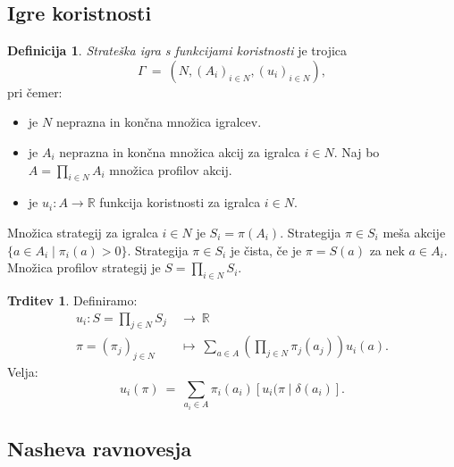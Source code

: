 \documentclass[11pt]{article}
\newcommand{\R}{\mathbb{R}}
\newcommand{\set}[1]{\{#1\}}
\newcommand{\oklepaj}[1]{\left(#1\right)}
\newcommand{\oglati}[1]{\left[#1\right]}
\theoremstyle{definition}
\newtheorem{definicija}{Definicija}[section]
\theoremstyle{definition}
\newtheorem{trditev}{Trditev}[section]
\theoremstyle{definition}
\theoremstyle{definition}
\begin{document}

\subsection{Igre koristnosti}
\vspace{0.5cm}

\begin{definicija}

\textit{Strateška igra s funkcijami koristnosti} je trojica 
$$\Gamma ~=~ (N, (A_i)_{i \in N}, (u_i)_{i \in N}),$$
pri čemer:
\begin{itemize}
	\item je $N$ neprazna in končna množica igralcev.
	\item je $A_i$ neprazna in končna množica akcij za igralca $i \in N$. Naj bo $A = \prod_{i \in N} A_i$ množica profilov akcij.
	\item je $u_i: A \rightarrow \R$ funkcija koristnosti za igralca $i \in N$.
\end{itemize}

\noindent Množica strategij za igralca $i \in N$ je $S_i = \pi(A_i)$. Strategija $\pi \in S_i$ meša akcije $\set{a \in A_i \mid \pi_i(a) > 0}$. Strategija $\pi \in S_i$ je čista, če je $\pi = S(a)$ za nek $a \in A_i$. Množica profilov strategij je $S = \prod_{i \in N} S_i$.

\end{definicija}
\vspace{0.5cm}

\begin{trditev}

Definiramo:
\begin{align*}
u_i: S = \prod_{j \in N} S_j ~&\rightarrow~ \R \\
\pi = (\pi_j)_{j \in N} ~&\mapsto~ \sum_{a \in A} \oklepaj{\prod_{j \in N}\pi_j(a_j)} u_i(a).
\end{align*}
Velja:
$$u_i(\pi) ~=~ \sum_{a_i \in A} \pi_i(a_i) \oglati{u_i(\pi \mid \delta(a_i)}.$$

\end{trditev}
\vspace{0.5cm}


\subsection{Nasheva ravnovesja}
\vspace{0.5cm}
\end{document}
